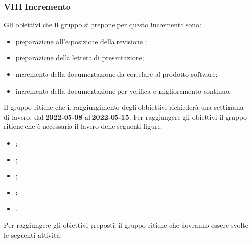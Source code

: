 
\pagebreak

\subsubsection{VIII Incremento}
Gli obiettivi che il gruppo si prepone per questo incremento sono:
\begin{itemize}
	\item preparazione all’esposizione della revisione \PB{};
  	\item preparazione della lettera di presentazione;
 	\item incremento della documentazione da correlare al prodotto software;
	\item incremento della documentazione per verifica e miglioramento continuo.
\end{itemize}
Il gruppo ritiene che il raggiungimento degli obbiettivi richiederà una settimana di lavoro, dal \textbf{2022-05-08} al \textbf{2022-05-15}.
Per raggiungere gli obiettivi il gruppo ritiene che è necessario il lavoro delle seguenti figure:
\begin{itemize}
	\item \RE{};
 	\item \AM{};
   	\item \PT{};
    \item \PR{};
   	\item \VE{}.
\end{itemize}
Per raggiungere gli obiettivi preposti, il gruppo ritiene che dovranno essere svolte le seguenti attività:
